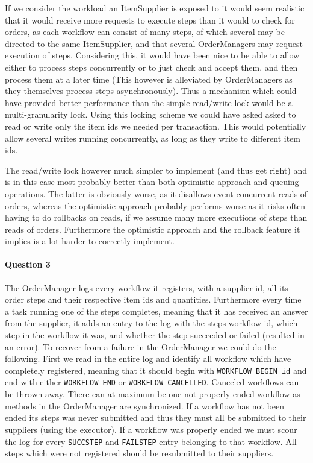 \documentclass[a4paper, 11pt]{article}
\begin{document}
If we consider the workload an ItemSupplier is exposed to it would seem realistic that it would receive more requests to execute steps than it would to check for orders, as each workflow can consist of many steps, of which several may be directed to the same ItemSupplier, and that several OrderManagers may request execution of steps. Considering this, it would have been nice to be able to allow either to process steps concurrently or to just check and accept them, and then process them at a later time (This however is alleviated by OrderManagers as they themselves process steps asynchronously). Thus a mechanism which could have provided better performance than the simple read/write lock would be a multi-granularity lock. Using this locking scheme we could have asked asked to read or write only the item ids we needed per transaction. This would potentially allow several writes running concurrently, as long as they write to different item ids.

The read/write lock however much simpler to implement (and thus get right) and is in this case most probably better than both optimistic approach and queuing operations. The latter is obviously worse, as it disallows event concurrent reads of orders, whereas the optimistic approach probably performs worse as it risks often having to do rollbacks on reads, if we assume many more executions of steps than reads of orders. Furthermore the optimistic approach and the rollback feature it implies is a lot harder to correctly implement.


\paragraph{Question 3} %
\label{par:question_3}
The OrderManager logs every workflow it registers, with a supplier id, all its order steps and their respective item ids and quantities. Furthermore every time a task running one of the steps completes, meaning that it has received an answer from the supplier, it adds an entry to the log with the steps workflow id, which step in the workflow it was, and whether the step succeeded or failed (resulted in an error). To recover from a failure in the OrderManager we could do the following. First we read in the entire log and identify all workflow which have completely registered, meaning that it should begin with \texttt{WORKFLOW BEGIN id} and end with either \texttt{WORKFLOW END} or \texttt{WORKFLOW CANCELLED}. Canceled workflows can be thrown away. There can at maximum be one not properly ended workflow as methods in the OrderManager are synchronized. If a workflow has not been ended its steps was never submitted and thus they must all be submitted to their suppliers (using the executor). If a workflow was properly ended we must scour the log for every \texttt{SUCCSTEP} and \texttt{FAILSTEP} entry belonging to that workflow. All steps which were not registered should be resubmitted to their suppliers.
\end{document}
